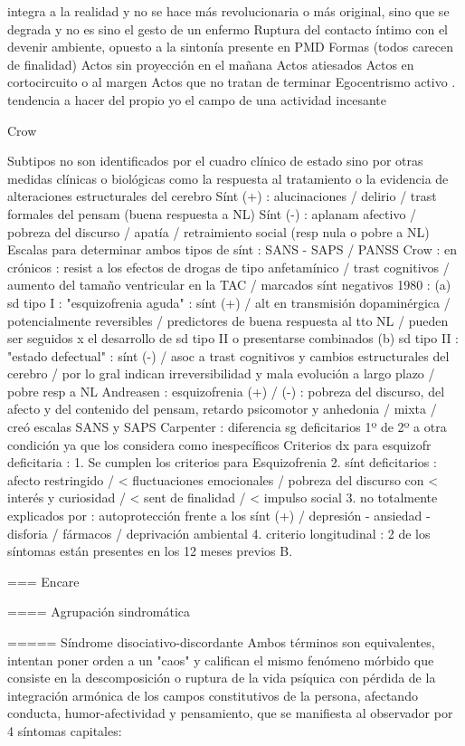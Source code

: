 integra a la realidad y no se hace más revolucionaria o más original, sino que se degrada y no es sino el gesto de un enfermo Ruptura del contacto íntimo con el devenir ambiente, opuesto a la sintonía presente en PMD Formas (todos carecen de finalidad) Actos sin proyección en el mañana Actos atiesados Actos en cortocircuito o al margen Actos que no tratan de terminar Egocentrismo activo . tendencia a hacer del propio yo el campo de una actividad incesante

Crow

Subtipos no son identificados por el cuadro clínico de estado sino por otras medidas clínicas o biológicas como la respuesta al tratamiento o la evidencia de alteraciones estructurales del cerebro Sínt (+) : alucinaciones / delirio / trast formales del pensam (buena respuesta a NL) Sínt (-) : aplanam afectivo / pobreza del discurso / apatía / retraimiento social (resp nula o pobre a NL) Escalas para determinar ambos tipos de sínt : SANS - SAPS / PANSS Crow : en crónicos : resist a los efectos de drogas de tipo anfetamínico / trast cognitivos / aumento del tamaño ventricular en la TAC / marcados sínt negativos 1980 : (a) sd tipo I : "esquizofrenia aguda" : sínt (+) / alt en transmisión dopaminérgica / potencialmente reversibles / predictores de buena respuesta al tto NL / pueden ser seguidos x el desarrollo de sd tipo II o presentarse combinados (b) sd tipo II : "estado defectual" : sínt (-) / asoc a trast cognitivos y cambios estructurales del cerebro / por lo gral indican irreversibilidad y mala evolución a largo plazo / pobre resp a NL Andreasen : esquizofrenia (+) / (-) : pobreza del discurso, del afecto y del contenido del pensam, retardo psicomotor y anhedonia / mixta / creó escalas SANS y SAPS Carpenter : diferencia sg deficitarios 1º de 2º a otra condición ya que los considera como inespecíficos Criterios dx para esquizofr deficitaria : 1. Se cumplen los criterios para Esquizofrenia 2. sínt deficitarios : afecto restringido / < fluctuaciones emocionales / pobreza del discurso con < interés y curiosidad / < sent de finalidad / < impulso social 3. no totalmente explicados por : autoprotección frente a los sínt (+) / depresión - ansiedad - disforia / fármacos / deprivación ambiental 4. criterio longitudinal : 2 de los síntomas están presentes en los 12 meses previos B.

=== Encare

==== Agrupación sindromática

===== Síndrome disociativo-discordante
Ambos términos son equivalentes, intentan poner orden a un "caos" y califican el mismo fenómeno mórbido que consiste en la descomposición o ruptura de la vida psíquica con pérdida de la integración armónica de los campos constitutivos de la persona, afectando conducta, humor-afectividad y pensamiento, que se manifiesta al observador por 4 síntomas capitales:

